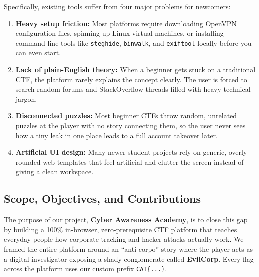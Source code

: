 \documentclass[11pt,a4paper]{article}
\begin{document}
Specifically, existing tools suffer from four major problems for newcomers:
\begin{enumerate}
    \item \textbf{Heavy setup friction:} Most platforms require downloading OpenVPN configuration files, spinning up Linux virtual machines, or installing command-line tools like \texttt{steghide}, \texttt{binwalk}, and \texttt{exiftool} locally before you can even start.
    \item \textbf{Lack of plain-English theory:} When a beginner gets stuck on a traditional CTF, the platform rarely explains the concept clearly. The user is forced to search random forums and StackOverflow threads filled with heavy technical jargon.
    \item \textbf{Disconnected puzzles:} Most beginner CTFs throw random, unrelated puzzles at the player with no story connecting them, so the user never sees how a tiny leak in one place leads to a full account takeover later.
    \item \textbf{Artificial UI design:} Many newer student projects rely on generic, overly rounded web templates that feel artificial and clutter the screen instead of giving a clean workspace.
\end{enumerate}

\subsection{Scope, Objectives, and Contributions}
The purpose of our project, \textbf{Cyber Awareness Academy}, is to close this gap by building a 100\% in-browser, zero-prerequisite CTF platform that teaches everyday people how corporate tracking and hacker attacks actually work. We framed the entire platform around an ``anti-corpo'' story where the player acts as a digital investigator exposing a shady conglomerate called \textbf{EvilCorp}. Every flag across the platform uses our custom prefix \texttt{CAT\{...\}}.
\end{document}
